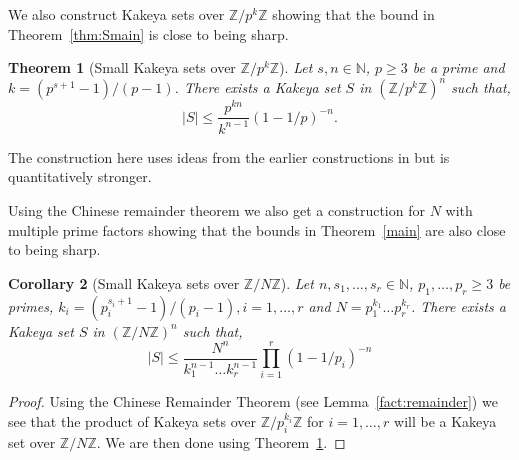 \documentclass[11pt]{article}
\numberwithin{equation}{section}
\newtheorem{thm}{Theorem}[section]
\newtheorem{cor}[thm]{Corollary}
\def\Z{{\mathbb{Z}}}
\def\N{{\mathbb{N}}}
\begin{document}
We also construct Kakeya sets over $\Z/p^k\Z$ showing that the bound in Theorem~\ref{thm:Smain} is close to being sharp. 

\begin{thm}[Small Kakeya sets over $\Z/p^k\Z$]\label{thm:con}
Let $s,n\in \N$, $p\ge 3$ be a prime and $k=(p^{s+1}-1)/(p-1)$. There exists a Kakeya set $S$ in $(\Z/p^k\Z)^n$ such that,
$$|S|\le \frac{p^{kn}}{k^{n-1}}(1-1/p)^{-n}.$$
\end{thm}

The construction here uses ideas from the earlier constructions in \cite{hickman2018fourier,Fraser_2016,CML_2018__10_1_3_0} but is quantitatively stronger.

Using the Chinese remainder theorem we also get a construction for $N$ with multiple prime factors showing that the bounds in Theorem~\ref{main} are also close to being sharp.

\begin{cor}[Small Kakeya sets over $\Z/N\Z$]\label{cor:con}
Let $n,s_1,\hdots,s_r\in \N$, $p_1,\hdots,p_r\ge 3$ be primes, $k_i=(p_i^{s_i+1}-1)/(p_i-1),i=1,\hdots,r$ and $N=p_1^{k_1}\hdots p_r^{k_r}$. There exists a Kakeya set $S$ in $(\Z/N\Z)^n$ such that,
$$|S|\le \frac{N^n}{k_1^{n-1}\hdots k_r^{n-1}} \prod\limits_{i=1}^r (1-1/p_i)^{-n} $$
\end{cor}
\begin{proof}
Using the Chinese Remainder Theorem (see Lemma~\ref{fact:remainder}) we see that the product of Kakeya sets over $\Z/p_i^{k_i}\Z$ for $i=1,\hdots,r$ will be a Kakeya set over $\Z/N\Z$. We are then done using Theorem~\ref{thm:con}.
\end{proof}
\end{document}
